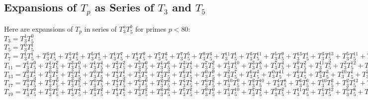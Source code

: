 \subsection{Expansions of $T_p$ as Series of $T_3$ and $T_5$}
\label{expansionsOfTp}
Here are expansions of $T_p$ in series of $T_3^aT_5^b$ for primes $p<80$:\\
$T_{3} = T_3^{1}T_5^{0}$\\
$T_{5} = T_3^{0}T_5^{1}$\\
$T_{7} = T_3^{1}T_5^{1} + T_3^{3}T_5^{1} + T_3^{3}T_5^{3} + T_3^{5}T_5^{1} + T_3^{1}T_5^{7} + T_3^{1}T_5^{9} + T_3^{7}T_5^{3} + T_3^{7}T_5^{5} + T_3^{9}T_5^{3} + T_3^{11}T_5^{1} + T_3^{3}T_5^{11} + T_3^{5}T_5^{9} + T_3^{13}T_5^{1} + T_3^{3}T_5^{13} + T_3^{5}T_5^{11} + T_3^{9}T_5^{7} + T_3^{11}T_5^{5} + T_3^{13}T_5^{3} + T_3^{3}T_5^{15} + T_3^{7}T_5^{11} + T_3^{9}T_5^{9} + T_3^{13}T_5^{5} + T_3^{15}T_5^{3} + \dots $\\   
$T_{11} = T_3^{1}T_5^{0} + T_3^{1}T_5^{2} + T_3^{3}T_5^{0} + T_3^{1}T_5^{4} + T_3^{3}T_5^{2} + T_3^{5}T_5^{0} + T_3^{1}T_5^{6} + T_3^{3}T_5^{4} + T_3^{7}T_5^{2} + T_3^{1}T_5^{10} + T_3^{3}T_5^{8} + T_3^{7}T_5^{4} + T_3^{9}T_5^{2} + T_3^{11}T_5^{2} + T_3^{3}T_5^{12} + T_3^{5}T_5^{10} + T_3^{7}T_5^{8} + T_3^{11}T_5^{4} + T_3^{13}T_5^{2} + T_3^{9}T_5^{8} + T_3^{17}T_5^{0} + \dots $\\
$T_{13} = T_3^{0}T_5^{1} + T_3^{0}T_5^{3} + T_3^{2}T_5^{1} + T_3^{0}T_5^{5} + T_3^{4}T_5^{1} + T_3^{2}T_5^{5} + T_3^{4}T_5^{3} + T_3^{6}T_5^{1} + T_3^{0}T_5^{9} + T_3^{2}T_5^{7} + T_3^{6}T_5^{3} + T_3^{0}T_5^{11} + T_3^{6}T_5^{5} + T_3^{8}T_5^{3} + T_3^{10}T_5^{1} + T_3^{2}T_5^{11} + T_3^{4}T_5^{9} + T_3^{6}T_5^{7} + T_3^{10}T_5^{3} + T_3^{2}T_5^{13} + T_3^{4}T_5^{11} + T_3^{14}T_5^{1} + T_3^{2}T_5^{15} + T_3^{4}T_5^{13} + T_3^{6}T_5^{11} + T_3^{12}T_5^{5} + T_3^{16}T_5^{1} + \dots $\\
$T_{17} = T_3^{0}T_5^{2} + T_3^{2}T_5^{0} + T_3^{2}T_5^{2} + T_3^{0}T_5^{6} + T_3^{4}T_5^{2} + T_3^{6}T_5^{0} + T_3^{2}T_5^{6} + T_3^{4}T_5^{4} + T_3^{6}T_5^{2} + T_3^{10}T_5^{0} + T_3^{2}T_5^{10} + T_3^{4}T_5^{8} + T_3^{6}T_5^{6} + T_3^{10}T_5^{2} + T_3^{2}T_5^{12} + T_3^{6}T_5^{8} + T_3^{10}T_5^{4} + T_3^{2}T_5^{14} + T_3^{6}T_5^{10} + T_3^{8}T_5^{8} + T_3^{12}T_5^{4} + T_3^{14}T_5^{2} + T_3^{4}T_5^{14} + T_3^{8}T_5^{10} + T_3^{10}T_5^{8} + T_3^{12}T_5^{6} + T_3^{16}T_5^{2} + T_3^{18}T_5^{0} + \dots $\\
$T_{19} = T_3^{1}T_5^{0} + T_3^{3}T_5^{0} + T_3^{1}T_5^{4} + T_3^{3}T_5^{2} + T_3^{1}T_5^{6} + T_3^{5}T_5^{2} + T_3^{3}T_5^{6} + T_3^{7}T_5^{2} + T_3^{9}T_5^{0} + T_3^{1}T_5^{10} + T_3^{7}T_5^{4} + T_3^{9}T_5^{2} + T_3^{11}T_5^{0} + T_3^{1}T_5^{12} + T_3^{5}T_5^{8} + T_3^{11}T_5^{2} + T_3^{13}T_5^{0} + T_3^{3}T_5^{12} + T_3^{7}T_5^{8} + T_3^{9}T_5^{6} + T_3^{11}T_5^{4} + T_3^{13}T_5^{2} + T_3^{3}T_5^{14} + T_3^{7}T_5^{10} + T_3^{11}T_5^{6} + T_3^{15}T_5^{2} + T_3^{17}T_5^{0} + \dots $\\
